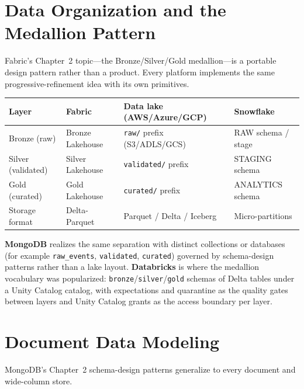 \section{Data Organization and the Medallion Pattern}
%
Fabric's Chapter~2 topic---the Bronze/Silver/Gold medallion---is a portable design pattern rather
than a product. Every platform implements the same progressive-refinement idea with its own primitives.

\begin{center}
\footnotesize
\begin{tabular}{@{}p{2.6cm}p{3.4cm}p{3.4cm}p{3.0cm}@{}}
\toprule
\textbf{Layer} & \textbf{Fabric} & \textbf{Data lake (AWS/Azure/GCP)} & \textbf{Snowflake} \\
\midrule
Bronze (raw) & Bronze Lakehouse & \texttt{raw/} prefix (S3/ADLS/GCS) & RAW schema / stage \\
Silver (validated) & Silver Lakehouse & \texttt{validated/} prefix & STAGING schema \\
Gold (curated) & Gold Lakehouse & \texttt{curated/} prefix & ANALYTICS schema \\
Storage format & Delta-Parquet & Parquet / Delta / Iceberg & Micro-partitions \\
\bottomrule
\end{tabular}
\end{center}

\noindent \textbf{MongoDB} realizes the same separation with distinct collections or databases
(for example \texttt{raw\_events}, \texttt{validated}, \texttt{curated}) governed by schema-design
patterns rather than a lake layout. \textbf{Databricks} is where the medallion vocabulary was
popularized: \texttt{bronze}/\texttt{silver}/\texttt{gold} schemas of Delta tables under a Unity
Catalog catalog, with expectations and quarantine as the quality gates between layers and Unity
Catalog grants as the access boundary per layer.

\section{Document Data Modeling}
%
MongoDB's Chapter~2 schema-design patterns generalize to every document and wide-column store.

